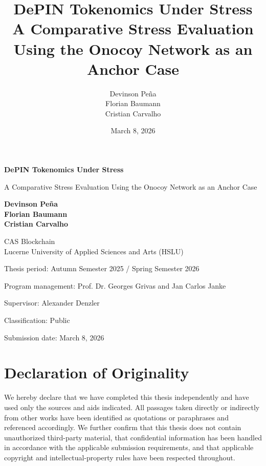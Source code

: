 \documentclass[12pt,a4paper]{article}
\title{
    \textbf{DePIN Tokenomics Under Stress} \\
    \large A Comparative Stress Evaluation Using the Onocoy Network as an Anchor Case
}
\author{Devinson Peña \\ Florian Baumann \\ Cristian Carvalho}
\date{March 8, 2026}
\begin{document}
\hypersetup{pageanchor=false}
\begin{titlepage}
    \centering
    \vspace*{1cm}

    {\Huge \textbf{DePIN Tokenomics Under Stress}\par}

    \vspace{0.5cm}
    {\Large A Comparative Stress Evaluation Using the Onocoy Network as an Anchor Case\par}

    \vspace{1.5cm}

    \textbf{Devinson Peña} \\
    \textbf{Florian Baumann} \\
    \textbf{Cristian Carvalho}

    \vfill

    CAS Blockchain \\
    Lucerne University of Applied Sciences and Arts (HSLU)

    \vspace{0.8cm}
    Thesis period: Autumn Semester 2025 / Spring Semester 2026

    \vspace{0.4cm}
    Program management: Prof. Dr. Georges Grivas and Jan Carlos Janke

    \vspace{0.4cm}
    Supervisor: Alexander Denzler

    \vspace{0.8cm}
    Classification: Public

    \vspace{0.8cm}
    Submission date: March 8, 2026
\end{titlepage}

\thispagestyle{empty}
\section*{Declaration of Originality}
We hereby declare that we have completed this thesis independently and have used only the sources and aids indicated. All passages taken directly or indirectly from other works have been identified as quotations or paraphrases and referenced accordingly. We further confirm that this thesis does not contain unauthorized third-party material, that confidential information has been handled in accordance with the applicable submission requirements, and that applicable copyright and intellectual-property rules have been respected throughout.
\end{document}
